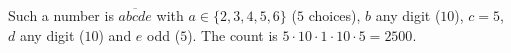 Such a number is $\overline{abcde}$ with $a\in\{2,3,4,5,6\}$ ($5$ choices), $b$ any digit ($10$), $c=5$, $d$ any digit ($10$) and $e$ odd ($5$). The count is $5\cdot10\cdot1\cdot10\cdot5=\boxed{2500}$.

